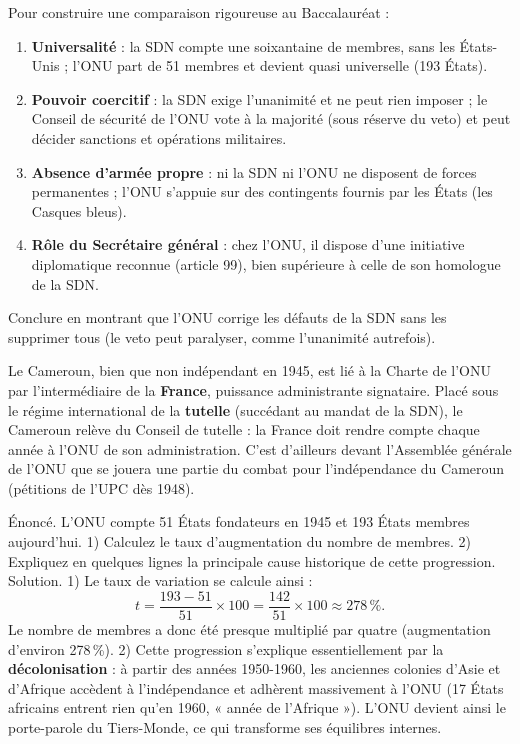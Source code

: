 \documentclass[11pt]{article}
\begin{document}
\begin{methode}
Pour construire une comparaison rigoureuse au Baccalauréat :
\begin{enumerate}
\item \textbf{Universalité} : la SDN compte une soixantaine de membres, sans les États-Unis ; l'ONU part de 51 membres et devient quasi universelle (193 États).
\item \textbf{Pouvoir coercitif} : la SDN exige l'unanimité et ne peut rien imposer ; le Conseil de sécurité de l'ONU vote à la majorité (sous réserve du veto) et peut décider sanctions et opérations militaires.
\item \textbf{Absence d'armée propre} : ni la SDN ni l'ONU ne disposent de forces permanentes ; l'ONU s'appuie sur des contingents fournis par les États (les Casques bleus).
\item \textbf{Rôle du Secrétaire général} : chez l'ONU, il dispose d'une initiative diplomatique reconnue (article 99), bien supérieure à celle de son homologue de la SDN.
\end{enumerate}
Conclure en montrant que l'ONU corrige les défauts de la SDN sans les supprimer tous (le veto peut paralyser, comme l'unanimité autrefois).
\end{methode}

\begin{savaistu}
Le Cameroun, bien que non indépendant en 1945, est lié à la Charte de l'ONU par l'intermédiaire de la \textbf{France}, puissance administrante signataire. Placé sous le régime international de la \textbf{tutelle} (succédant au mandat de la SDN), le Cameroun relève du Conseil de tutelle : la France doit rendre compte chaque année à l'ONU de son administration. C'est d'ailleurs devant l'Assemblée générale de l'ONU que se jouera une partie du combat pour l'indépendance du Cameroun (pétitions de l'UPC dès 1948).
\end{savaistu}

\begin{exoresolu}
Énoncé. L'ONU compte 51 États fondateurs en 1945 et 193 États membres aujourd'hui. 1) Calculez le taux d'augmentation du nombre de membres. 2) Expliquez en quelques lignes la principale cause historique de cette progression.
\tcblower
Solution. 1) Le taux de variation se calcule ainsi :
\[ t = \frac{193 - 51}{51} \times 100 = \frac{142}{51} \times 100 \approx 278\,\%. \]
Le nombre de membres a donc été presque multiplié par quatre (augmentation d'environ 278\,\%). 2) Cette progression s'explique essentiellement par la \textbf{décolonisation} : à partir des années 1950-1960, les anciennes colonies d'Asie et d'Afrique accèdent à l'indépendance et adhèrent massivement à l'ONU (17 États africains entrent rien qu'en 1960, « année de l'Afrique »). L'ONU devient ainsi le porte-parole du Tiers-Monde, ce qui transforme ses équilibres internes.
\end{exoresolu}
\end{document}
